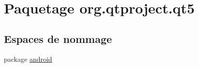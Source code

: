 \hypertarget{namespaceorg_1_1qtproject_1_1qt5}{\section{Paquetage org.\-qtproject.\-qt5}
\label{namespaceorg_1_1qtproject_1_1qt5}
}
\subsection*{Espaces de nommage}
\begin{DoxyCompactItemize}
\item 
package \hyperlink{namespaceorg_1_1qtproject_1_1qt5_1_1android}{android}
\end{DoxyCompactItemize}
